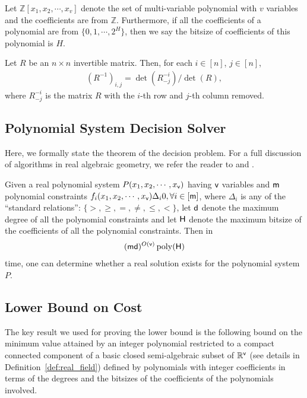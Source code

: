 Let $\mathbb{Z}[x_1, x_2, \cdots,x_v]$ denote the set of multi-variable polynomial with $v$ variables and the coefficients are from $\mathbb{Z}$. Furthermore, if all the coefficients of a polynomial are from $\{0,1, \cdots, 2^H\}$, then we say the bitsize of coefficients of this polynomial is $H$.

\begin{lemma}
Let $R$ be an $n \times n$ invertible matrix. Then, for each $i \in [n]$, $j \in [n]$,
\begin{align*}
    (R^{-1})_{i,j} = \det( R_{ -j }^{-i} ) / \det(R),
\end{align*}
where $R_{ -j }^{-i}$ is the matrix $R$ with the $i$-th row and $j$-th column removed.
\end{lemma}




\subsection{Polynomial System Decision Solver}

Here, we formally state the theorem of the decision problem. 
For a full discussion of
algorithms in real algebraic geometry, we refer the reader to \cite{bpr5}
and \cite{b14}.
\begin{theorem}\label{thm:decision_problem}
Given a real polynomial system $P (x_{1}, x_{2}, \cdots, x_{\mathsf{v}} )$ having $\mathsf{v}$ variables and $\mathsf{m}$ polynomial constraints $f_{i} (x_{1}, x_{2}, \cdots, x_{\mathsf{v}} ) \Delta_{i} 0, \forall i \in[\mathsf{m}]$, where $\Delta_{i}$ is any of the ``standard relations'': $\{>, \geq,=, \neq, \leq ,<\}$, let $\mathsf{d}$ denote the maximum degree of all the polynomial constraints and let $\mathsf{H}$ denote the maximum bitsize of the coefficients of all the polynomial constraints.  
Then in
\begin{align*}
(\mathsf{m} \mathsf{d})^{O(\mathsf{v})} \operatorname{poly}(\mathsf{H})
\end{align*}
time, one can determine whether a real solution exists for the polynomial system $P$.
\end{theorem}


\subsection{Lower Bound on Cost}
The key result we used for proving the lower bound is the
following bound on the minimum value attained by an integer
polynomial restricted to a compact connected component
of a basic closed semi-algebraic subset of $\mathbb{R}^{\mathsf{v}}$ (see details in Definition~\ref{def:real_field}) defined by polynomials with integer coefficients in terms of the degrees
and the bitsizes of the coefficients of the polynomials involved. 

